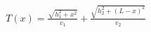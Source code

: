 \documentclass[preview]{standalone}
\begin{document}
\begin{align*}
T(x) = \frac{\sqrt{h_1^2 + x^2}}{v_1} + \frac{\sqrt{h_2^2 + (L-x)^2}}{v_2}
\end{align*}
\end{document}
